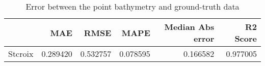 \begin{table}[h!]
\caption{Error between the point bathymetry and ground-truth data}
\label{tab:Stcroix_lidar_error}
\begin{tabular}{lrrrrr}
\toprule
 & MAE & RMSE & MAPE & Median Abs error & R2 Score \\
\midrule
Stcroix & 0.289420 & 0.532757 & 0.078595 & 0.166582 & 0.977005 \\
\bottomrule
\end{tabular}
\end{table}
